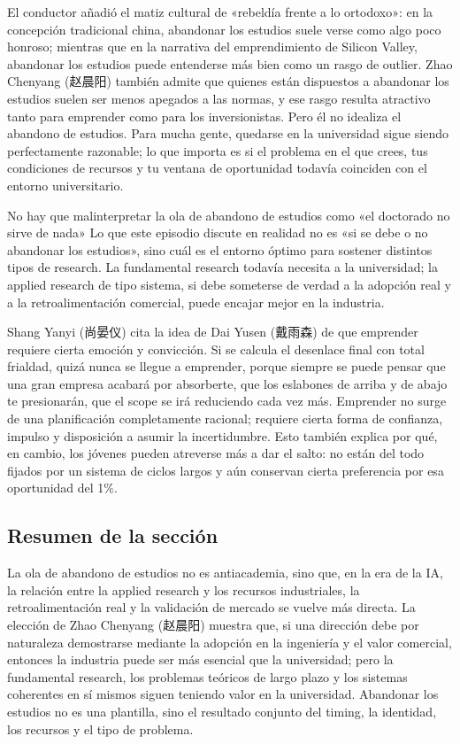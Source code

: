 El conductor añadió el matiz cultural de «rebeldía frente a lo ortodoxo»: en la concepción tradicional china, abandonar los estudios suele verse como algo poco honroso; mientras que en la narrativa del emprendimiento de Silicon Valley, abandonar los estudios puede entenderse más bien como un rasgo de outlier. Zhao Chenyang (赵晨阳) también admite que quienes están dispuestos a abandonar los estudios suelen ser menos apegados a las normas, y ese rasgo resulta atractivo tanto para emprender como para los inversionistas. Pero él no idealiza el abandono de estudios. Para mucha gente, quedarse en la universidad sigue siendo perfectamente razonable; lo que importa es si el problema en el que crees, tus condiciones de recursos y tu ventana de oportunidad todavía coinciden con el entorno universitario.

\begin{warningbox}{No hay que malinterpretar la ola de abandono de estudios como «el doctorado no sirve de nada»}
Lo que este episodio discute en realidad no es «si se debe o no abandonar los estudios», sino cuál es el entorno óptimo para sostener distintos tipos de research. La fundamental research todavía necesita a la universidad; la applied research de tipo sistema, si debe someterse de verdad a la adopción real y a la retroalimentación comercial, puede encajar mejor en la industria.
\end{warningbox}

Shang Yanyi (尚晏仪) cita la idea de Dai Yusen (戴雨森) de que emprender requiere cierta emoción y convicción. Si se calcula el desenlace final con total frialdad, quizá nunca se llegue a emprender, porque siempre se puede pensar que una gran empresa acabará por absorberte, que los eslabones de arriba y de abajo te presionarán, que el scope se irá reduciendo cada vez más. Emprender no surge de una planificación completamente racional; requiere cierta forma de confianza, impulso y disposición a asumir la incertidumbre. Esto también explica por qué, en cambio, los jóvenes pueden atreverse más a dar el salto: no están del todo fijados por un sistema de ciclos largos y aún conservan cierta preferencia por esa oportunidad del 1\%.

\subsection{Resumen de la sección}

La ola de abandono de estudios no es antiacademia, sino que, en la era de la IA, la relación entre la applied research y los recursos industriales, la retroalimentación real y la validación de mercado se vuelve más directa. La elección de Zhao Chenyang (赵晨阳) muestra que, si una dirección debe por naturaleza demostrarse mediante la adopción en la ingeniería y el valor comercial, entonces la industria puede ser más esencial que la universidad; pero la fundamental research, los problemas teóricos de largo plazo y los sistemas coherentes en sí mismos siguen teniendo valor en la universidad. Abandonar los estudios no es una plantilla, sino el resultado conjunto del timing, la identidad, los recursos y el tipo de problema.
